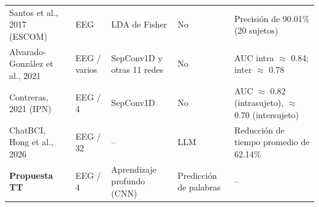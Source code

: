 \begin{table}[htbp]
\begin{tabularx}{\textwidth}{L{3.1cm}L{1.8cm}L{2.4cm}L{2.1cm}Y}
Santos et al., 2017 (ESCOM) \cite{santos2017} & EEG & LDA de Fisher & No & Precisión de 90.01\% (20 sujetos) \\
Alvarado-González et al., 2021 \cite{alvarado2021} & EEG / varios & SepConv1D y otras 11 redes & No & AUC intra $\approx$ 0.84; inter $\approx$ 0.78 \\
Contreras, 2021 (IPN) \cite{contreras2021} & EEG / 4 & SepConv1D & No & AUC $\approx$ 0.82 (intrasujeto), $\approx$ 0.70 (intersujeto) \\
ChatBCI, Hong et al., 2026 \cite{hong2026} & EEG / 32 & -- & LLM & Reducción de tiempo promedio de 62.14\% \\
\midrule
\textbf{Propuesta TT} & EEG / 4 & Aprendizaje profundo (CNN) & Predicción de palabras & -- \\
\bottomrule
\end{tabularx}
\par{}
\end{table}

